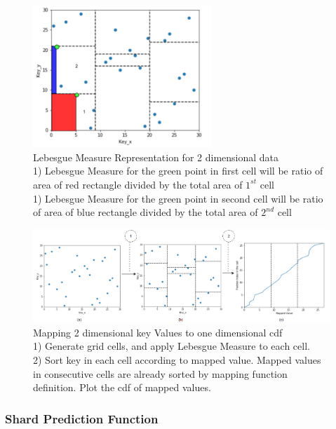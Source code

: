 \begin{figure}[t]
    \centering
    \includegraphics[width=0.6\textwidth]{graphs/Lebesgue_Measure.png}
    \caption{Lebesgue Measure Representation for 2 dimensional data\\
    1) Lebesgue Measure for the green point in first cell will be ratio of area of red rectangle divided by the total area of $1^{st}$ cell \\
    1) Lebesgue Measure for the green point in second cell will be ratio of area of blue rectangle divided by the total area of $2^{nd}$ cell}
    \label{fig:Lebesgue_Measure}
\end{figure}

\begin{figure}[t]
    \centering
    \includegraphics[width=1\textwidth]{graphs/Mapped_cdf.png}
    \caption{Mapping 2 dimensional key Values to one dimensional cdf\\
    1) Generate grid cells, and apply Lebesgue Measure to each cell.\\
    2) Sort key in each cell according to mapped value. Mapped values in consecutive cells are already sorted by mapping function definition. Plot the cdf of mapped values. }
    \label{fig:Mapped_Cdf}
\end{figure}

\subsubsection{Shard Prediction Function}

